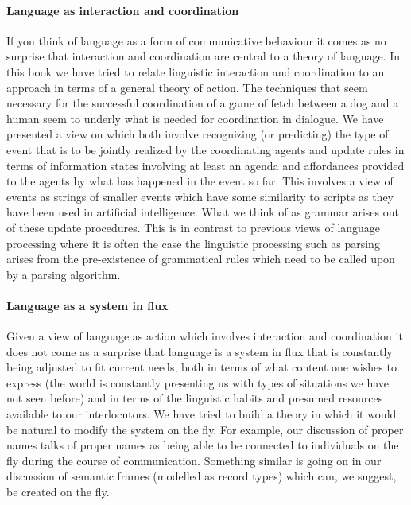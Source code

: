 \paragraph{Language as interaction and coordination}  If you think of
language as a form of communicative behaviour it comes as no surprise
that interaction and coordination are central to a theory of
language.  In this book we have tried to relate linguistic interaction
and coordination to an approach in terms of a general theory of
action.  The techniques that seem necessary for the successful
coordination of a game of fetch between a dog and a human seem to
underly what is needed for coordination in dialogue.  We have
presented a view on which both involve recognizing (or predicting) the
type of event that is to be jointly realized by the coordinating
agents and update rules in terms of information states involving at
least an agenda and affordances provided to the agents by what has
happened in the event so far.  This involves a view of events as
strings of smaller events which have some similarity to scripts as
they have been used in artificial intelligence.  What we think of as
grammar arises out of these update procedures.  This is in contrast to
previous views of language processing where it is often the case the
linguistic processing such as parsing arises from the pre-existence of
grammatical rules which need to be called upon by a parsing algorithm.

\paragraph{Language as a system in flux}  Given a view of language as
action which involves interaction and coordination it does not come as
a surprise that language is a system in flux that is constantly being
adjusted to fit current needs, both in terms of what content one
wishes to express (the world is constantly presenting us with types of
situations we have not seen before) and in terms of the linguistic
habits and presumed resources available to our interlocutors.  We have
tried to build a theory in which it would be natural to modify the
system on the fly.  For example, our discussion of proper names talks
of proper names as being able to be connected to individuals on the
fly during the course of communication.  Something similar is going on
in our discussion of semantic frames (modelled as record types) which
can, we suggest, be created on the fly.

